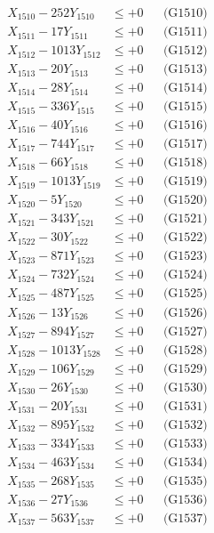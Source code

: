 \documentclass[a4paper,10pt]{article}
\begin{document}
{\begin{align}
X_{1510} - 252Y_{1510} &\leq +0 && \text{(G1510)} \\
\allowbreak
X_{1511} - 17Y_{1511} &\leq +0 && \text{(G1511)} \\
X_{1512} - 1013Y_{1512} &\leq +0 && \text{(G1512)} \\
X_{1513} - 20Y_{1513} &\leq +0 && \text{(G1513)} \\
X_{1514} - 28Y_{1514} &\leq +0 && \text{(G1514)} \\
X_{1515} - 336Y_{1515} &\leq +0 && \text{(G1515)} \\
X_{1516} - 40Y_{1516} &\leq +0 && \text{(G1516)} \\
X_{1517} - 744Y_{1517} &\leq +0 && \text{(G1517)} \\
X_{1518} - 66Y_{1518} &\leq +0 && \text{(G1518)} \\
X_{1519} - 1013Y_{1519} &\leq +0 && \text{(G1519)} \\
X_{1520} - 5Y_{1520} &\leq +0 && \text{(G1520)} \\
\allowbreak
X_{1521} - 343Y_{1521} &\leq +0 && \text{(G1521)} \\
X_{1522} - 30Y_{1522} &\leq +0 && \text{(G1522)} \\
X_{1523} - 871Y_{1523} &\leq +0 && \text{(G1523)} \\
X_{1524} - 732Y_{1524} &\leq +0 && \text{(G1524)} \\
X_{1525} - 487Y_{1525} &\leq +0 && \text{(G1525)} \\
X_{1526} - 13Y_{1526} &\leq +0 && \text{(G1526)} \\
X_{1527} - 894Y_{1527} &\leq +0 && \text{(G1527)} \\
X_{1528} - 1013Y_{1528} &\leq +0 && \text{(G1528)} \\
X_{1529} - 106Y_{1529} &\leq +0 && \text{(G1529)} \\
X_{1530} - 26Y_{1530} &\leq +0 && \text{(G1530)} \\
\allowbreak
X_{1531} - 20Y_{1531} &\leq +0 && \text{(G1531)} \\
X_{1532} - 895Y_{1532} &\leq +0 && \text{(G1532)} \\
X_{1533} - 334Y_{1533} &\leq +0 && \text{(G1533)} \\
X_{1534} - 463Y_{1534} &\leq +0 && \text{(G1534)} \\
X_{1535} - 268Y_{1535} &\leq +0 && \text{(G1535)} \\
X_{1536} - 27Y_{1536} &\leq +0 && \text{(G1536)} \\
X_{1537} - 563Y_{1537} &\leq +0 && \text{(G1537)} \\

\end{align}}
\end{document}
